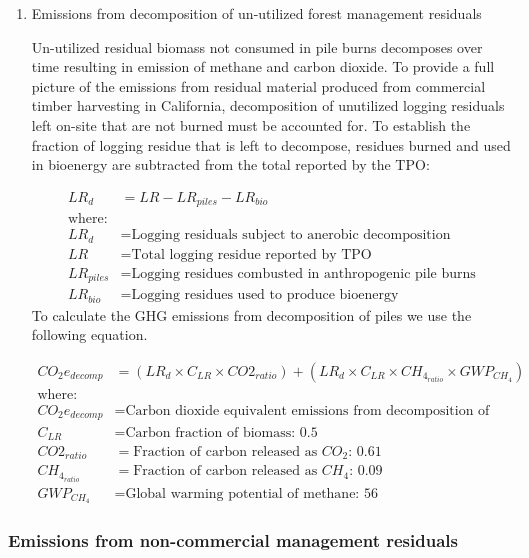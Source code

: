 \documentclass[a4paper]{article}
\begin{document}
\begin{enumerate}
\item Emissions from decomposition of un-utilized forest management residuals
\label{sec-1-3-3-2}

Un-utilized residual biomass not consumed in pile burns decomposes over
time resulting in emission of methane and carbon dioxide. To provide a
full picture of the emissions from residual material produced from
commercial timber harvesting in California, decomposition of unutilized
logging residuals left on-site that are not burned must be accounted
for. To establish the fraction of logging residue that is left to
decompose, residues burned and used in bioenergy are subtracted from the
total reported by the TPO:

\begin{align*}
LR_d &= LR - LR_{piles} - LR_{bio} \\
\text{where:}\\
LR_d &= \text{Logging residuals subject to anerobic decomposition} \\
LR &= \text{Total logging residue reported by TPO}\\
LR_{piles} &= \text{Logging residues combusted in anthropogenic pile burns}\\
LR_{bio} &= \text{Logging residues used to produce bioenergy}
\end{align*}
To calculate the GHG emissions from decomposition of piles we use the
following equation.

\begin{align*}
CO_2e_{decomp} &= \left(LR_d \times C_{LR} \times CO2_{ratio} \right) + \left(LR_d \times C_{LR} \times CH_4_{ratio}\times GWP_{CH_4}\right)\\
\text{where:}\\
CO_2e_{decomp} &= \text{Carbon dioxide equivalent emissions from decomposition of logging slash}\\
C_{LR} &= \text{Carbon fraction of biomass: 0.5}\\
CO2_{ratio} &= \text{Fraction of carbon released as } CO_2\text{: 0.61}\\
CH_4_{ratio} &= \text{Fraction of carbon released as } CH_4\text{: 0.09}\\
GWP_{CH_4} &= \text{Global warming potential of methane: 56}
\end{align*}
\end{enumerate}

\subsubsection{Emissions from non-commercial management residuals}
\label{sec-1-3-4}
\end{document}
